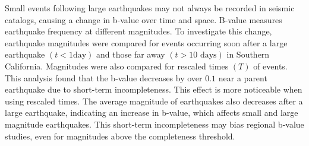 \documentclass[12pt]{article} %
\theoremstyle{plain}
\begin{document}
	Small events following large earthquakes may not always be recorded in seismic catalogs, causing a change in b-value over time and space. B-value measures earthquake frequency at different magnitudes. To investigate this change, earthquake magnitudes were compared for events occurring soon after a large earthquake $(t < 1 \text{day})$ and those far away $(t > 10 \text{ days})$ in Southern California. Magnitudes were also compared for rescaled times $(T)$ of events. This analysis found that the b-value decreases by over $0.1$ near a parent earthquake due to short-term incompleteness. This effect is more noticeable when using rescaled times. The average magnitude of earthquakes also decreases after a large earthquake, indicating an increase in b-value, which affects small and large magnitude earthquakes. This short-term incompleteness may bias regional b-value studies, even for magnitudes above the completeness threshold.
	
\end{document}
